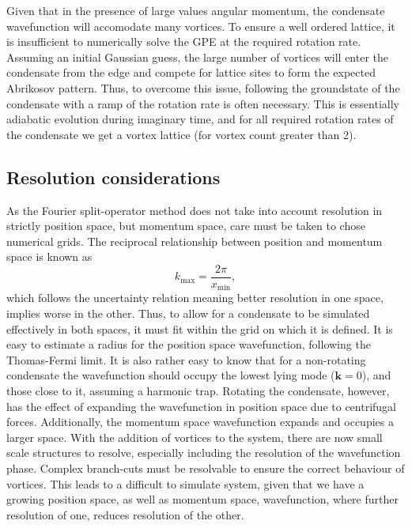 Given that in the presence of large values angular momentum, the condensate wavefunction will accomodate many vortices. To ensure a well ordered lattice, it is insufficient to numerically solve the GPE at the required rotation rate. Assuming an initial Gaussian guess, the large number of vortices will enter the condensate from the edge and compete for lattice sites to form the expected Abrikosov pattern. Thus, to overcome this issue, following the groundstate of the condensate with a ramp of the rotation rate is often necessary. This is essentially adiabatic evolution during imaginary time, and for all required rotation rates of the condensate we get a vortex lattice (for vortex count greater than 2).



\subsection{Resolution considerations}
As the Fourier split-operator method does not take into account resolution in strictly position space, but momentum space, care must be taken to chose numerical grids. The reciprocal relationship between position and momentum space is known as \begin{equation}
    k_{\text{max}} = \frac{2\pi}{x_{\text{min}}},
\end{equation}
which follows the uncertainty relation meaning better resolution in one space, implies worse in the other. Thus, to allow for a condensate to be simulated effectively in both spaces, it must fit within the grid on which it is defined. It is easy to estimate a radius for the position space wavefunction, following the Thomas-Fermi limit. It is also rather easy to know that for a non-rotating condensate the wavefunction should occupy the lowest lying mode ($\mathbf{k}=0$), and those close to it, assuming a harmonic trap. Rotating the condensate, however, has the effect of expanding the wavefunction in position space due to centrifugal forces. Additionally, the momentum space wavefunction expands and occupies a larger space. With the addition of vortices to the system, there are now small scale structures to resolve, especially including the resolution of the wavefunction phase. Complex branch-cuts must be resolvable to ensure the correct behaviour of vortices. This leads to a difficult to simulate system, given that we have a growing position space, as well as momentum space, wavefunction, where further resolution of one, reduces resolution of the other.


